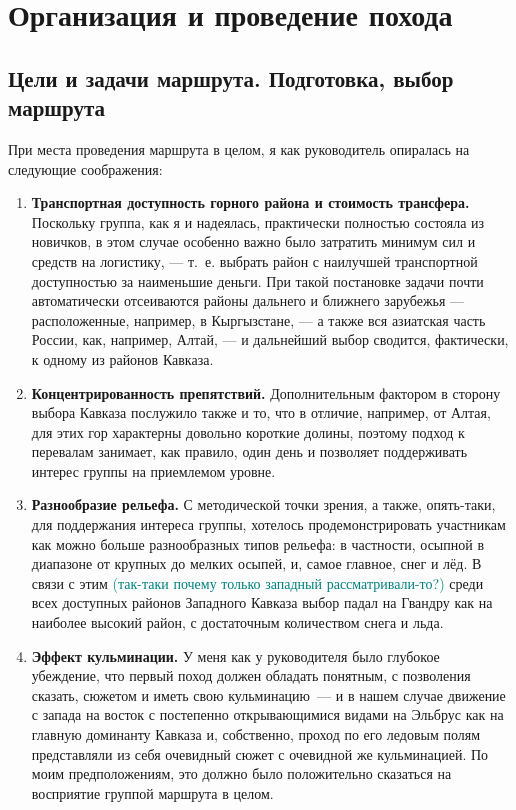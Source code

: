 \section{Организация и проведение похода}

\subsection{Цели и задачи маршрута. Подготовка, выбор маршрута}

При места проведения маршрута в целом, я как руководитель опиралась на следующие соображения: 
\begin{enumerate} 
	\item \textbf{Транспортная доступность горного района и стоимость трансфера.}
	Поскольку группа, как я и надеялась, практически полностью состояла из новичков, в этом случае особенно важно было затратить минимум сил и средств на логистику, --- т.~е. выбрать район с наилучшей транспортной доступностью за наименьшие деньги. При такой постановке задачи почти автоматически отсеиваются районы дальнего и ближнего зарубежья --- расположенные, например, в Кыргызстане, --- а также вся азиатская часть России, как, например, Алтай, --- и дальнейший выбор сводится, фактически, к одному из районов Кавказа. 
	
	\item \textbf{Концентрированность препятствий.}
	Дополнительным фактором в сторону выбора Кавказа послужило также и то, что в отличие, например, от Алтая, для этих гор характерны довольно короткие долины, поэтому подход к перевалам занимает, как правило, один день и позволяет поддерживать интерес группы на приемлемом уровне.
	
	\item \textbf{Разнообразие рельефа.} 
	С методической точки зрения, а также, опять-таки, для поддержания интереса группы, хотелось продемонстрировать участникам как можно больше разнообразных типов рельефа: в частности, осыпной в диапазоне от крупных до мелких осыпей, и, самое главное, снег и лёд. В связи с этим \textcolor{teal}{(так-таки почему только западный рассматривали-то?)} среди всех доступных районов Западного Кавказа выбор падал на Гвандру как на наиболее высокий район, с достаточным количеством снега и льда. 
	
	\item \textbf{Эффект кульминации.}
	У меня как у руководителя было глубокое убеждение, что первый поход должен обладать понятным, с позволения сказать, сюжетом и иметь свою кульминацию~--- и в нашем случае движение с запада на восток с постепенно открывающимися видами на Эльбрус как на главную доминанту Кавказа и, собственно, проход по его ледовым полям представляли из себя очевидный сюжет с очевидной же кульминацией. По моим предположениям, это должно было положительно сказаться на восприятие группой  маршрута в целом. 
	

\end{enumerate}
